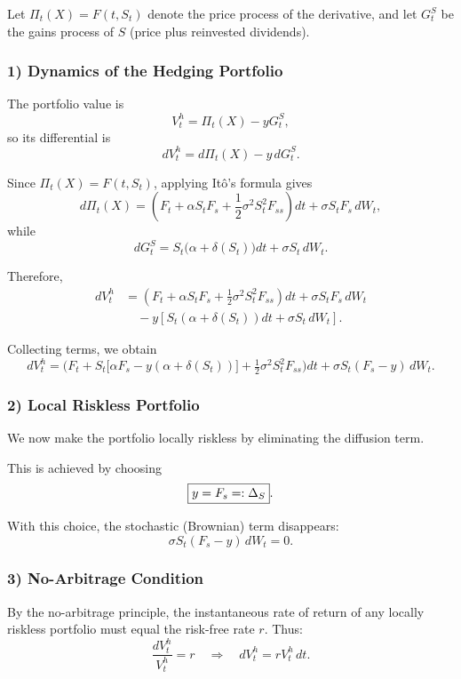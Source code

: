 \documentclass[12pt,a4paper]{article}
\theoremstyle{definition}
\begin{document}
Let $\Pi_t(X) = F(t, S_t)$ denote the price process of the derivative, and let $G_t^S$ be the gains process of $S$ (price plus reinvested dividends).

\subsubsection{1) Dynamics of the Hedging Portfolio}

The portfolio value is
\[
V_t^h = \Pi_t(X) - y G_t^S,
\]
so its differential is
\[
dV_t^h = d\Pi_t(X) - y\, dG_t^S.
\]

Since $\Pi_t(X) = F(t, S_t)$, applying Itô's formula gives
\[
d\Pi_t(X) = \left(F_t + \alpha S_t F_s + \frac{1}{2}\sigma^2 S_t^2 F_{ss}\right)dt + \sigma S_t F_s\, dW_t,
\]
while
\[
dG_t^S = S_t\big(\alpha + \delta(S_t)\big)dt + \sigma S_t\, dW_t.
\]

Therefore,
\[
\begin{aligned}
dV_t^h &= \left(F_t + \alpha S_t F_s + \frac{1}{2}\sigma^2 S_t^2 F_{ss}\right)dt + \sigma S_t F_s\, dW_t \\
&\quad - y\left[ S_t(\alpha + \delta(S_t))dt + \sigma S_t\, dW_t\right].
\end{aligned}
\]

Collecting terms, we obtain
\[
dV_t^h = \Big( F_t + S_t\big[\alpha F_s - y(\alpha + \delta(S_t))\big] + \tfrac{1}{2} \sigma^2 S_t^2 F_{ss} \Big) dt + \sigma S_t (F_s - y)\, dW_t.
\]

\subsubsection{2) Local Riskless Portfolio}

We now make the portfolio locally riskless by eliminating the diffusion term.

This is achieved by choosing
\[
\fbox{$y = F_s =: \Delta_S$}.
\]

With this choice, the stochastic (Brownian) term disappears:
\[
\sigma S_t (F_s - y)\, dW_t = 0.
\]

\subsubsection{3) No-Arbitrage Condition}

By the no-arbitrage principle, the instantaneous rate of return of any locally riskless portfolio must equal the risk-free rate $r$. Thus:
\[
\frac{dV_t^h}{V_t^h} = r \quad \Longrightarrow \quad dV_t^h = r V_t^h\, dt.
\]
\end{document}
